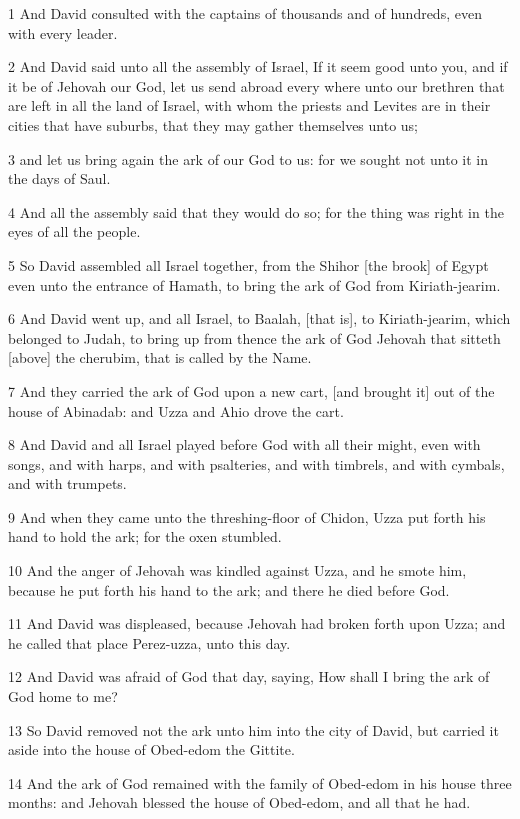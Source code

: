 \par 1 And David consulted with the captains of thousands and of hundreds, even with every leader.
\par 2 And David said unto all the assembly of Israel, If it seem good unto you, and if it be of Jehovah our God, let us send abroad every where unto our brethren that are left in all the land of Israel, with whom the priests and Levites are in their cities that have suburbs, that they may gather themselves unto us;
\par 3 and let us bring again the ark of our God to us: for we sought not unto it in the days of Saul.
\par 4 And all the assembly said that they would do so; for the thing was right in the eyes of all the people.
\par 5 So David assembled all Israel together, from the Shihor [the brook] of Egypt even unto the entrance of Hamath, to bring the ark of God from Kiriath-jearim.
\par 6 And David went up, and all Israel, to Baalah, [that is], to Kiriath-jearim, which belonged to Judah, to bring up from thence the ark of God Jehovah that sitteth [above] the cherubim, that is called by the Name.
\par 7 And they carried the ark of God upon a new cart, [and brought it] out of the house of Abinadab: and Uzza and Ahio drove the cart.
\par 8 And David and all Israel played before God with all their might, even with songs, and with harps, and with psalteries, and with timbrels, and with cymbals, and with trumpets.
\par 9 And when they came unto the threshing-floor of Chidon, Uzza put forth his hand to hold the ark; for the oxen stumbled.
\par 10 And the anger of Jehovah was kindled against Uzza, and he smote him, because he put forth his hand to the ark; and there he died before God.
\par 11 And David was displeased, because Jehovah had broken forth upon Uzza; and he called that place Perez-uzza, unto this day.
\par 12 And David was afraid of God that day, saying, How shall I bring the ark of God home to me?
\par 13 So David removed not the ark unto him into the city of David, but carried it aside into the house of Obed-edom the Gittite.
\par 14 And the ark of God remained with the family of Obed-edom in his house three months: and Jehovah blessed the house of Obed-edom, and all that he had.

